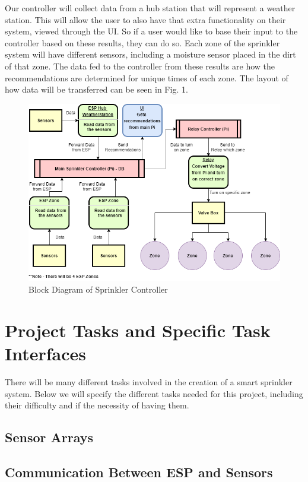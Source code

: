 \documentclass[letterpaper, 10 pt, conference]{ieeeconf}  %
\begin{document}
Our controller will collect data from a hub station that will represent a weather station. This will allow the user to also have that extra functionality on their system, viewed through the UI. So if a user would like to base their input to the controller based on these results, they can do so. Each zone of the sprinkler system will have different sensors, including a moisture sensor placed in the dirt of that zone. The data fed to the controller from these results are how the recommendations are determined for unique times of each zone. The layout of how data will be transferred can be seen in Fig. 1.

\begin{figure}[H]
\includegraphics[scale=.4]{Diagram.png}
\caption{Block Diagram of Sprinkler Controller}
\end{figure}

\section{Project Tasks and Specific Task Interfaces}
There will be many different tasks involved in the creation of a smart sprinkler system. Below we will specify the different tasks needed for this project, including their difficulty and if the necessity of having them.

\subsection{Sensor Arrays}

\subsection{Communication Between ESP and Sensors}
\end{document}
